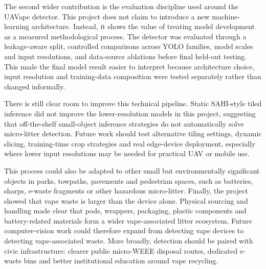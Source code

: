 The second wider contribution is the evaluation discipline used around the UAVape detector. This project does not claim to introduce a new machine-learning architecture. Instead, it shows the value of treating model development as a measured methodological process. The detector was evaluated through a leakage-aware split, controlled comparisons across YOLO families, model scales and input resolutions, and data-source ablations before final held-out testing. This made the final model result easier to interpret because architecture choice, input resolution and training-data composition were tested separately rather than changed informally.

There is still clear room to improve this technical pipeline. Static SAHI-style tiled inference did not improve the lower-resolution models in this project, suggesting that off-the-shelf small-object inference strategies do not automatically solve micro-litter detection. Future work should test alternative tiling settings, dynamic slicing, training-time crop strategies and real edge-device deployment, especially where lower input resolutions may be needed for practical UAV or mobile use.

This process could also be adapted to other small but environmentally significant objects in parks, towpaths, pavements and pedestrian spaces, such as batteries, sharps, e-waste fragments or other hazardous micro-litter. Finally, the project showed that vape waste is larger than the device alone. Physical sourcing and handling made clear that pods, wrappers, packaging, plastic components and battery-related materials form a wider vape-associated litter ecosystem. Future computer-vision work could therefore expand from detecting vape devices to detecting vape-associated waste. More broadly, detection should be paired with civic infrastructure: clearer public micro-WEEE disposal routes, dedicated e-waste bins and better institutional education around vape recycling.
